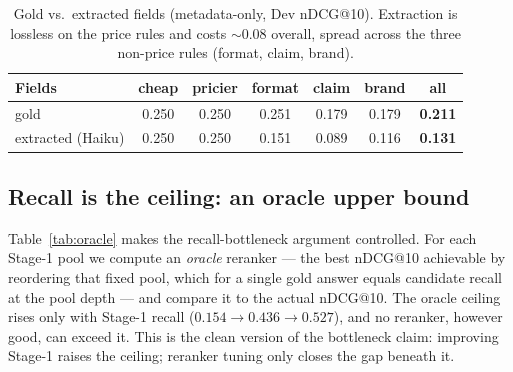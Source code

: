 \documentclass[sigconf,nonacm]{acmart}
\begin{document}
\begin{table}[t]
\centering\small
\caption{Gold vs.\ extracted fields (metadata-only, Dev nDCG@10). Extraction
is lossless on the price rules and costs $\sim$0.08 overall, spread across the
three non-price rules (format, claim, brand).}
\label{tab:goldext}
\begin{tabular}{@{}lcccccc@{}}
\toprule
Fields & cheap & pricier & format & claim & brand & \textbf{all} \\
\midrule
gold             & 0.250 & 0.250 & 0.251 & 0.179 & 0.179 & \textbf{0.211} \\
extracted (Haiku)& 0.250 & 0.250 & 0.151 & 0.089 & 0.116 & \textbf{0.131} \\
\bottomrule
\end{tabular}
\end{table}

\subsection{Recall is the ceiling: an oracle upper bound}
\label{sec:oracle}
Table~\ref{tab:oracle} makes the recall-bottleneck argument controlled. For
each Stage-1 pool we compute an \emph{oracle} reranker --- the best nDCG@10
achievable by reordering that fixed pool, which for a single gold answer
equals candidate recall at the pool depth --- and compare it to the actual
nDCG@10. The oracle ceiling rises only with Stage-1 recall
($0.154\to0.436\to0.527$), and no reranker, however good, can exceed it.
This is the clean version of the bottleneck claim: improving Stage-1
raises the ceiling; reranker tuning only closes the gap beneath it.

\begin{table}[t]
\centering\small
\caption{Stage-1 candidate recall and the resulting oracle-reranker nDCG@10
ceiling vs.\ the Stage-1 nDCG@10 (Dev-429). For a single gold answer, oracle
nDCG@10 at depth $d$ equals R@$d$: oracle@20$=$R@20 (the depth the deployed
reranker sees) and oracle@50$=$R@50 (the full retrieved pool).}
\label{tab:oracle}
\end{table}
\end{document}
